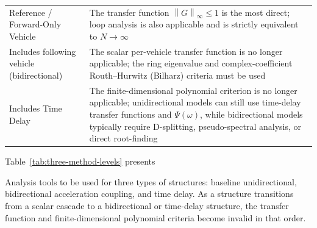 \documentclass[11pt,a4paper,openany]{book}
\numberwithin{equation}{chapter}
\numberwithin{figure}{chapter}
\numberwithin{table}{chapter}
\newcommand{\tabletext}[2]{%
  \par\smallskip\noindent
  Table~\ref{#1} presents #2
\par\smallskip
}
\begin{document}
\begin{tcolorbox}[keybox,title=\textbf{Clue 3: The Three-Tiered Structure of the Method}]
\begin{center}
\small
{}
\label{tab:three-method-levels}
\begin{tabular}{p{4.2cm}p{9.6cm}}
\toprule







Reference / Forward-Only Vehicle




&




The transfer function $\left\|G\right\|_\infty\le1$ is the most direct; loop analysis is also applicable and is strictly equivalent to $N\to\infty$\\[4pt]

Includes following vehicle (bidirectional)




&




 The scalar per-vehicle transfer function is no longer applicable; the ring eigenvalue and complex-coefficient Routh–Hurwitz (Bilharz) criteria must be used



\\[4pt]

Includes Time Delay




&




 The finite-dimensional polynomial criterion is no longer applicable; unidirectional models can still use time-delay transfer functions and $\Psi(\omega)$, while bidirectional models typically require D-splitting, pseudo-spectral analysis, or direct root-finding



\\
\bottomrule
\end{tabular}
\end{center}
\tabletext{tab:three-method-levels}{




Analysis tools to be used for three types of structures: baseline unidirectional, bidirectional acceleration coupling, and time delay. As a structure transitions from a scalar cascade to a bidirectional or time-delay structure, the transfer function and finite-dimensional polynomial criteria become invalid in that order.
}
\end{tcolorbox}
\end{document}
